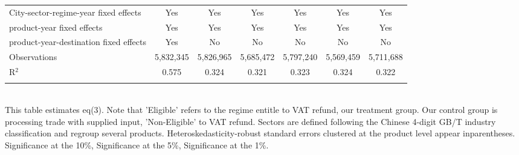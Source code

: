 \documentclass[preview]{standalone}
\begin{document}
\begin{table}[!htbp]
\begin{adjustbox}{width=\textwidth, totalheight=\baselineskip,keepaspectratio}
\begin{tabular}{@{\extracolsep{5pt}}lcccccc}
City-sector-regime-year fixed effects & Yes & Yes & Yes & Yes & Yes & Yes \\ 
product-year fixed effects & Yes & Yes & Yes & Yes & Yes & Yes \\ 
product-year-destination fixed effects & Yes & No & No & No & No & No \\ 
Observations & 5,832,345 & 5,826,965 & 5,685,472 & 5,797,240 & 5,569,459 & 5,711,688 \\ 
R$^{2}$ & 0.575 & 0.324 & 0.321 & 0.323 & 0.324 & 0.322 \\ 
\hline 
\hline \\[-1.8ex] 
\end{tabular}
\end{adjustbox}
\begin{tablenotes} 
 \small 
 \item \\ 

This table estimates eq(3). 
Note that 'Eligible' refers to the regime entitle to VAT refund, our treatment group.
Our control group is processing trade with supplied input, 'Non-Eligible' to VAT refund.
Sectors are defined following the Chinese 4-digit GB/T industry
classification and regroup several products.
Heteroskedasticity-robust standard errors
clustered at the product level appear inparentheses.
\sym{*} Significance at the 10\%, \sym{**} Significance at the 5\%, \sym{***} Significance at the 1\%. 
\end{tablenotes}
\end{table}
\end{document}

